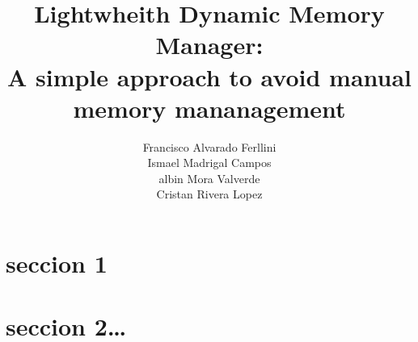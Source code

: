 \documentclass[twocolumn,showkeys,eqsecnum,prd,showpacs,notitlepage,9pt]{article}
\title{\textbf{Lightwheith Dynamic Memory Manager: \\A simple approach to avoid manual\\ memory mananagement}}%
\author{Francisco Alvarado Ferllini\\
		Ismael Madrigal Campos\\
		albin Mora Valverde\\
		Cristan Rivera Lopez}
\date{}
\begin{document}

\maketitle

\begin{abstract}%
\emph{\textbf{ }}
\end{abstract}%



\section{seccion 1}

\section{seccion 2\dots}


\pagestyle{fancy} 
\end{document}
